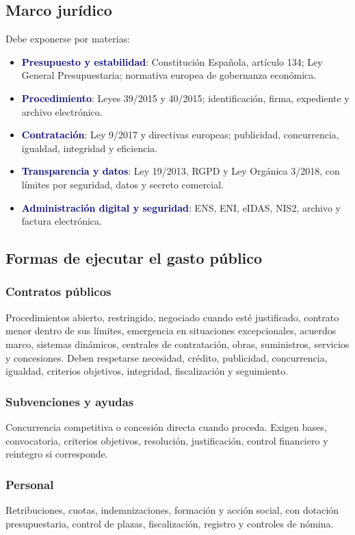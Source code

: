 \documentclass[11pt,a4paper]{article}
\newcommand{\key}[1]{\textbf{\textcolor{navy}{#1}}}
\begin{document}
\subsection{Marco jurídico}

Debe exponerse por materias:
\begin{itemize}
\item \key{Presupuesto y estabilidad}: Constitución Española, artículo 134; Ley General Presupuestaria; normativa europea de gobernanza económica.
\item \key{Procedimiento}: Leyes 39/2015 y 40/2015; identificación, firma, expediente y archivo electrónico.
\item \key{Contratación}: Ley 9/2017 y directivas europeas; publicidad, concurrencia, igualdad, integridad y eficiencia.
\item \key{Transparencia y datos}: Ley 19/2013, RGPD y Ley Orgánica 3/2018, con límites por seguridad, datos y secreto comercial.
\item \key{Administración digital y seguridad}: ENS, ENI, eIDAS, NIS2, archivo y factura electrónica.
\end{itemize}

\subsection{Formas de ejecutar el gasto público}

\subsubsection{Contratos públicos}
Procedimientos abierto, restringido, negociado cuando esté justificado, contrato menor dentro de sus límites, emergencia en situaciones excepcionales, acuerdos marco, sistemas dinámicos, centrales de contratación, obras, suministros, servicios y concesiones. Deben respetarse necesidad, crédito, publicidad, concurrencia, igualdad, criterios objetivos, integridad, fiscalización y seguimiento.

\subsubsection{Subvenciones y ayudas}
Concurrencia competitiva o concesión directa cuando proceda. Exigen bases, convocatoria, criterios objetivos, resolución, justificación, control financiero y reintegro si corresponde.

\subsubsection{Personal}
Retribuciones, cuotas, indemnizaciones, formación y acción social, con dotación presupuestaria, control de plazas, fiscalización, registro y controles de nómina.
\end{document}

